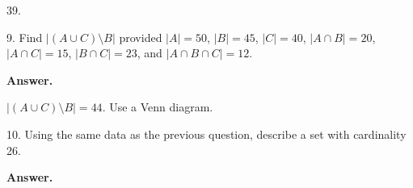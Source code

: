 \documentclass[10pt,]{book}
\theoremstyle{plain}
\theoremstyle{definition}
\theoremstyle{definition}
\theoremstyle{definition}
\numberwithin{equation}{section}
\begin{document}
\begin{exerciselist}
39.
%
\item[9.]\hypertarget{exercise-40}{}
Find \(|(A \cup C)\setminus B|\) provided \(|A| = 50\), \(|B| = 45\), \(|C| = 40\), \(|A\cap B| = 20\), \(|A \cap C| = 15\), \(|B \cap C| = 23\), and \(|A \cap B \cap C| = 12\).
%
\par\smallskip
\par\smallskip
\noindent\textbf{Answer.}\hypertarget{answer-40}{}\quad

\(|(A \cup C)\setminus B| = 44\). Use a Venn diagram.
%
\item[10.]\hypertarget{exercise-41}{}
Using the same data as the previous question, describe a set with cardinality 26.
%
\par\smallskip
\par\smallskip
\noindent\textbf{Answer.}\hypertarget{answer-41}{}\quad


\end{exerciselist}
\end{document}
